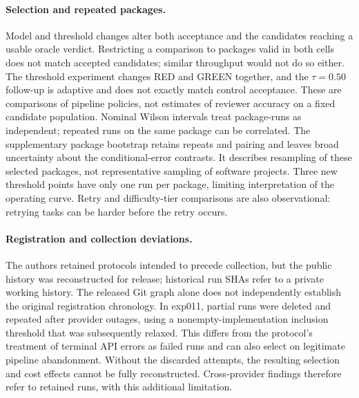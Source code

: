 \documentclass{article}
\begin{document}
\paragraph{Selection and repeated packages.} Model and threshold changes alter both acceptance
and the candidates reaching a usable oracle verdict. Restricting a comparison to packages valid
in both cells does not match accepted candidates; similar throughput would not do so either.
The threshold experiment changes RED and GREEN together, and the $\tau{=}0.50$ follow-up is
adaptive and does not exactly match control acceptance. These are comparisons of pipeline
policies, not estimates of reviewer accuracy on a fixed candidate population. Nominal Wilson
intervals treat package-runs as independent; repeated runs on the same package can be correlated.
The supplementary package bootstrap retains repeats and pairing and leaves broad uncertainty
about the conditional-error contrasts. It describes resampling of these selected packages,
not representative sampling of software projects. Three new threshold points have only one
run per package, limiting interpretation of the operating curve. Retry and difficulty-tier
comparisons are also observational: retrying tasks can be harder before the retry occurs.

\paragraph{Registration and collection deviations.} The authors retained protocols intended to
precede collection, but the public history was reconstructed for release; historical run SHAs
refer to a private working history. The released Git graph alone does not independently establish
the original registration chronology. In exp011, partial runs were deleted and repeated after
provider outages, using a nonempty-implementation inclusion threshold that was subsequently
relaxed. This differs from the protocol's treatment of terminal API errors as failed runs and can
also select on legitimate pipeline abandonment. Without the discarded attempts, the resulting
selection and cost effects cannot be fully reconstructed. Cross-provider findings therefore
refer to retained runs, with this additional limitation.
\end{document}
